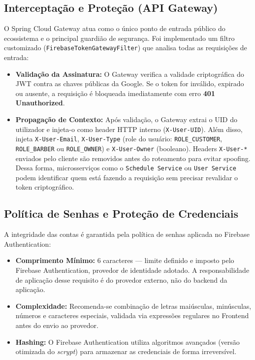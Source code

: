 \documentclass[
    12pt, 
    a4paper, 
    oneside, 
    chapter=TITLE, 
    section=TITLE
]{abntex2}
\begin{document}
\subsection{Interceptação e Proteção (API Gateway)}
O Spring Cloud Gateway atua como o único ponto de entrada público do ecossistema e o principal guardião de segurança. Foi implementado um filtro customizado (\texttt{FirebaseTokenGatewayFilter}) que analisa todas as requisições de entrada:
\begin{itemize}
    \item \textbf{Validação da Assinatura:} O Gateway verifica a validade criptográfica do JWT contra as chaves públicas da Google. Se o token for inválido, expirado ou ausente, a requisição é bloqueada imediatamente com erro \textbf{401 Unauthorized}.
    \item \textbf{Propagação de Contexto:} Após validação, o Gateway extrai o UID do utilizador e injeta-o como header HTTP interno (\texttt{X-User-UID}). Além disso, injeta \texttt{X-User-Email}, \texttt{X-User-Type} (role do usuário: \texttt{ROLE\_CUSTOMER}, \texttt{ROLE\_BARBER} ou \texttt{ROLE\_OWNER}) e \texttt{X-User-Owner} (booleano). Headers \texttt{X-User-*} enviados pelo cliente são removidos antes do roteamento para evitar spoofing. Dessa forma, microsserviços como o \texttt{Schedule Service} ou \texttt{User Service} podem identificar quem está fazendo a requisição sem precisar revalidar o token criptográfico.
\end{itemize}

\subsection{Política de Senhas e Proteção de Credenciais}
A integridade das contas é garantida pela política de senhas aplicada no Firebase Authentication:
\begin{itemize}
    \item \textbf{Comprimento Mínimo:} 6 caracteres — limite definido e imposto pelo Firebase Authentication, provedor de identidade adotado. A responsabilidade de aplicação desse requisito é do provedor externo, não do backend da aplicação.
    \item \textbf{Complexidade:} Recomenda-se combinação de letras maiúsculas, minúsculas, números e caracteres especiais, validada via expressões regulares no Frontend antes do envio ao provedor.
    \item \textbf{Hashing:} O Firebase Authentication utiliza algoritmos avançados (versão otimizada do \textit{scrypt}) para armazenar as credenciais de forma irreversível.
\end{itemize}
\end{document}

